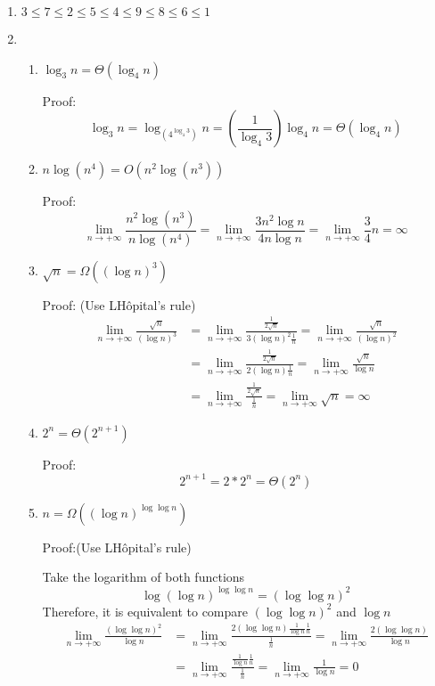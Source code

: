 \documentclass[11pt]{article}
\newenvironment{qparts}{\begin{enumerate}[{(}a{)}]}{\end{enumerate}}
\begin{document}
\begin{qparts}
\item 
$3 \leq  7 \leq 2 \leq 5 \leq 4 \leq 9 \leq 8 \leq 6 \leq 1$

\item 
\renewcommand{\theenumii}{\roman{enumii}}
\begin{enumerate}
  \item $\log_3n = \Theta(\log_4n)$
  
  Proof:
  \[
	 \log_3n  =  \log_{(4^{\log_4 3})}n = (\frac{1}{\log_4 3})\log_4n = \Theta(\log_4n)
 \]
  \item $n\log(n^4) = O(n^2\log(n^3))$
  
  Proof:
 \[
  	\lim_{n \to +\infty} \frac{n^2\log(n^3)}{n\log(n^4)} = \lim_{n \to +\infty} \frac{3n^2\log n}{4n\log n} = \lim_{n \to +\infty} \frac{3}{4}n = \infty
 \]
 
 \item $\sqrt{n} = \Omega((\log n)^3)$
 
 Proof: (Use L\textquotesingle Hôpital's rule)
 \begin{align*}
 	\lim_{n \to+\infty} \frac{\sqrt{n}}{(\log n)^3} 
	&= \lim_{n \to+\infty} \frac{\frac{1}{2\sqrt{n}}}{3(\log n)^2\frac{1}{n}} = \lim_{n \to+\infty} \frac{\sqrt{n}}{(\log n)^2} \\
	&= \lim_{n \to+\infty} \frac{\frac{1}{2\sqrt{n}}}{2(\log n)\frac{1}{n}} = \lim_{n \to+\infty} \frac{\sqrt{n}}{\log n} \\
	&= \lim_{n \to+\infty} \frac{\frac{1}{2\sqrt{n}}}{\frac{1}{n}} = \lim_{n \to+\infty} \sqrt{n} = \infty
 \end{align*}
 
 \item $2^n = \Theta(2^{n+1})$
 
 Proof:
 \[
 	2^{n+1} = 2 * 2^n = \Theta(2^n)
 \]
 
 \item $n = \Omega((\log n)^{\log \log n})$
 
 Proof:(Use L\textquotesingle Hôpital's rule)
 
 Take the logarithm of both functions
 \[
 	\log (\log n)^{\log \log n} = (\log \log n)^2
 \]
 Therefore, it is equivalent to compare $(\log \log n)^2$ and $\log n$
 \begin{align*}
 	\lim_{n \to+\infty} \frac{(\log \log n)^2}{\log n} 
	&= \lim_{n \to+\infty} \frac{2(\log \log n)\frac{1}{\log n}\frac{1}{n}}{\frac{1}{n}} = \lim_{n \to+\infty}\frac{2(\log \log n)}{\log n} \\
	&= \lim_{n \to+\infty} \frac{\frac{1}{\log n}\frac{1}{n}}{\frac{1}{n}} = \lim_{n \to+\infty}\frac{1}{\log n} = 0
 \end{align*}
 

\end{enumerate}
\end{qparts}
\end{document}
